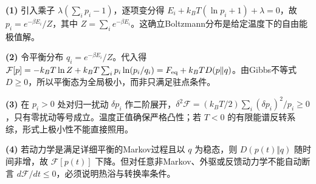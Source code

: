 \par\noindent\textbf{(1)} 引入乘子 \(\lambda(\sum_i p_i-1)\)，逐项变分得 \(E_i+k_BT(\ln p_i+1)+\lambda=0\)，故 \(p_i=e^{-\beta E_i}/Z\)，其中 \(Z=\sum_i e^{-\beta E_i}\)。这确立Boltzmann分布是给定温度下的自由能极值解。
\par\noindent\textbf{(2)} 令平衡分布 \(q_i=e^{-\beta E_i}/Z\)。代入得 \(\mathcal F[p]=-k_BT\ln Z+k_BT\sum_i p_i\ln(p_i/q_i)=F_{\rm eq}+k_BT D(p\Vert q)\)。由Gibbs不等式 \(D\ge0\)，所以平衡态为全局极小，而非只满足驻点条件。
\par\noindent\textbf{(3)} 在 \(p_i>0\) 处对归一扰动 \(\delta p_i\) 作二阶展开，\(\delta^2\mathcal F=(k_BT/2)\sum_i(\delta p_i)^2/p_i\ge0\)，只有零扰动等号成立。温度正值确保严格凸性；若 \(T<0\) 的有限能谱反转系综，形式上极小性不能直接照用。
\par\noindent\textbf{(4)} 若动力学是满足详细平衡的Markov过程且以 \(q\) 为稳态，则 \(D(p(t)\Vert q)\) 随时间非增，故 \(\mathcal F[p(t)]\) 下降。但对任意非Markov、外驱或反馈动力学不能自动断言 \(d\mathcal F/dt\le0\)，必须说明热浴与转换率条件。
